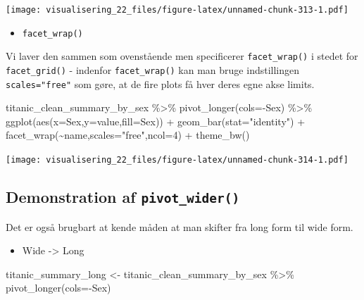\documentclass[
]{book}
\newenvironment{Shaded}{\begin{snugshade}}{\end{snugshade}}
\newcommand{\AttributeTok}[1]{\textcolor[rgb]{0.77,0.63,0.00}{#1}}
\newcommand{\DecValTok}[1]{\textcolor[rgb]{0.00,0.00,0.81}{#1}}
\newcommand{\FunctionTok}[1]{\textcolor[rgb]{0.00,0.00,0.00}{#1}}
\newcommand{\NormalTok}[1]{#1}
\newcommand{\OtherTok}[1]{\textcolor[rgb]{0.56,0.35,0.01}{#1}}
\newcommand{\SpecialCharTok}[1]{\textcolor[rgb]{0.00,0.00,0.00}{#1}}
\newcommand{\StringTok}[1]{\textcolor[rgb]{0.31,0.60,0.02}{#1}}
\providecommand{\tightlist}{%
  \setlength{\itemsep}{0pt}\setlength{\parskip}{0pt}}
\begin{document}
\texttt{[image: visualisering\_22\_files/figure-latex/unnamed-chunk-313-1.pdf]}

\begin{itemize}
\tightlist
\item
  \texttt{facet\_wrap()}
\end{itemize}

Vi laver den sammen som ovenstående men specificerer \texttt{facet\_wrap()} i stedet for \texttt{facet\_grid()} - indenfor \texttt{facet\_wrap()} kan man bruge indstillingen \texttt{scales="free"} som gøre, at de fire plots få hver deres egne akse limits.

\begin{Shaded}
\begin{Highlighting}[]
\NormalTok{titanic\_clean\_summary\_by\_sex }\SpecialCharTok{\%\textgreater{}\%} 
  \FunctionTok{pivot\_longer}\NormalTok{(}\AttributeTok{cols=}\SpecialCharTok{{-}}\NormalTok{Sex) }\SpecialCharTok{\%\textgreater{}\%}
  \FunctionTok{ggplot}\NormalTok{(}\FunctionTok{aes}\NormalTok{(}\AttributeTok{x=}\NormalTok{Sex,}\AttributeTok{y=}\NormalTok{value,}\AttributeTok{fill=}\NormalTok{Sex)) }\SpecialCharTok{+} 
  \FunctionTok{geom\_bar}\NormalTok{(}\AttributeTok{stat=}\StringTok{"identity"}\NormalTok{) }\SpecialCharTok{+} 
  \FunctionTok{facet\_wrap}\NormalTok{(}\SpecialCharTok{\textasciitilde{}}\NormalTok{name,}\AttributeTok{scales=}\StringTok{"free"}\NormalTok{,}\AttributeTok{ncol=}\DecValTok{4}\NormalTok{) }\SpecialCharTok{+}  
  \FunctionTok{theme\_bw}\NormalTok{()}
\end{Highlighting}
\end{Shaded}

\texttt{[image: visualisering\_22\_files/figure-latex/unnamed-chunk-314-1.pdf]}

\hypertarget{demonstration-af-pivot_wider}{%
\subsection{\texorpdfstring{Demonstration af \texttt{pivot\_wider()}}{Demonstration af pivot\_wider()}}\label{demonstration-af-pivot_wider}}

Det er også brugbart at kende måden at man skifter fra long form til wide form.

\begin{itemize}
\tightlist
\item
  Wide -\textgreater{} Long
\end{itemize}

\begin{Shaded}
\begin{Highlighting}[]
\NormalTok{titanic\_summary\_long }\OtherTok{\textless{}{-}}\NormalTok{ titanic\_clean\_summary\_by\_sex }\SpecialCharTok{\%\textgreater{}\%} 
  \FunctionTok{pivot\_longer}\NormalTok{(}\AttributeTok{cols=}\SpecialCharTok{{-}}\NormalTok{Sex)}
\end{Highlighting}
\end{Shaded}
\end{document}
